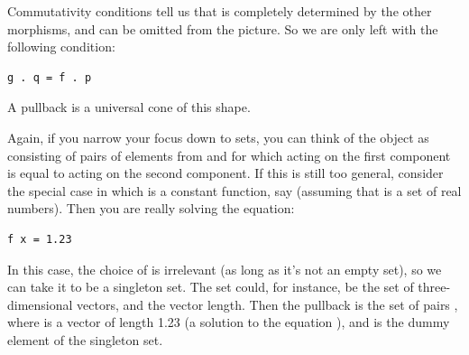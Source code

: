 \noindent
Commutativity conditions tell us that  is completely
determined by the other morphisms, and can be omitted from the picture.
So we are only left with the following condition:

\begin{Verbatim}[commandchars=\\\{\}]
g . q = f . p
\end{Verbatim}
A pullback is a universal cone of this shape.

\begin{figure}[H]
\centering
{}
\end{figure}

\noindent
Again, if you narrow your focus down to sets, you can think of the
object  as consisting of pairs of elements from  and
 for which  acting on the first component is equal
to  acting on the second component. If this is still too
general, consider the special case in which  is a constant
function, say  (assuming that  is a set
of real numbers). Then you are really solving the equation:

\begin{Verbatim}[commandchars=\\\{\}]
f x = 1.23
\end{Verbatim}
In this case, the choice of  is irrelevant (as long as it's
not an empty set), so we can take it to be a singleton set. The set
 could, for instance, be the set of three-dimensional vectors,
and  the vector length. Then the pullback is the set of pairs
, where  is a vector of length 1.23 (a
solution to the equation ), and
\code{()} is the dummy element of the singleton set.

